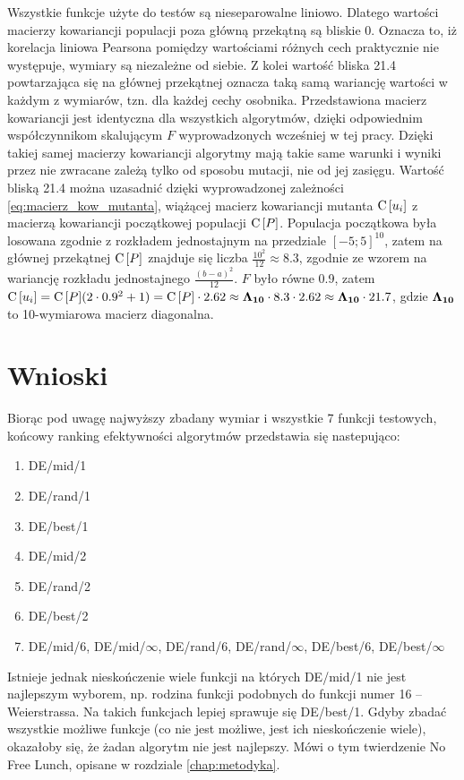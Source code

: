 \documentclass[a4paper,onecolumn,oneside,12pt,wide,floatssmall]{mwrep}
\def\C{{\rm C}\,}
\theoremstyle{definition}
\theoremstyle{plain}%
\theoremstyle{remark}
\begin{document}
Wszystkie funkcje użyte do testów są nieseparowalne liniowo.
Dlatego wartości macierzy kowariancji populacji poza główną przekątną są bliskie 0. Oznacza to,
iż korelacja liniowa Pearsona pomiędzy wartościami różnych cech praktycznie nie występuje, wymiary
są niezależne od siebie. Z kolei wartość bliska 21.4 powtarzająca się na głównej przekątnej 
oznacza taką samą wariancję wartości w każdym z wymiarów, tzn. dla każdej cechy osobnika.
Przedstawiona macierz kowariancji jest identyczna dla wszystkich algorytmów, 
dzięki odpowiednim współczynnikom skalującym
$F$ wyprowadzonych wcześniej w tej pracy. Dzięki takiej samej macierzy kowariancji algorytmy
mają takie same warunki i wyniki przez nie zwracane zależą tylko od sposobu mutacji, nie od jej
zasięgu. 
Wartość bliską 21.4 można uzasadnić dzięki wyprowadzonej zależności \eqref{eq:macierz_kow_mutanta},
wiążącej macierz kowariancji mutanta $\C[u_i]$
z macierzą kowariancji początkowej populacji $\C[P]$. Populacja początkowa była losowana zgodnie z 
rozkładem jednostajnym na przedziale $[-5;5]^{10}$, zatem na głównej przekątnej $\C[P]$
znajduje się liczba $\frac{10^2}{12} \approx 8.3$, zgodnie ze wzorem na wariancję rozkładu jednostajnego 
$\frac{(b - a)^2}{12}$. $F$ było równe 0.9, zatem 
$\C[u_i] = \C[P](2 \cdot 0.9^2 + 1) = \C[P] \cdot 2.62 \approx \bold{\Lambda_{10}} \cdot 8.3 \cdot 2.62 \approx \bold{\Lambda_{10}} \cdot 21.7$, gdzie $\bold{\Lambda_{10}}$
to 10-wymiarowa macierz diagonalna. 

\section{Wnioski}

Biorąc pod uwagę najwyższy zbadany wymiar i wszystkie 7 funkcji testowych,
końcowy ranking efektywności algorytmów przedstawia się 
nastepująco:

\begin{enumerate}
 \item DE/mid/1
 \item DE/rand/1
 \item DE/best/1
 \item DE/mid/2
 \item DE/rand/2
 \item DE/best/2
 \item DE/mid/6, DE/mid/$\infty$, DE/rand/6, DE/rand/$\infty$, DE/best/6, DE/best/$\infty$
\end{enumerate}

Istnieje jednak nieskończenie wiele funkcji na których DE/mid/1 nie jest najlepszym wyborem, np. rodzina
funkcji podobnych do funkcji numer 16 -- Weierstrassa. Na takich funkcjach lepiej sprawuje się 
DE/best/1. Gdyby zbadać wszystkie możliwe funkcje (co nie jest możliwe, jest ich nieskończenie wiele),
okazałoby się, że żadan algorytm nie jest
najlepszy. Mówi o tym twierdzenie No Free Lunch, opisane w rozdziale \ref{chap:metodyka}.
\end{document}
